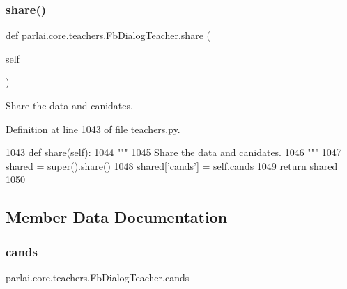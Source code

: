 \mbox{\label{classparlai_1_1core_1_1teachers_1_1FbDialogTeacher_a18a4ea7a7f21eeed7e087cb447a37c5a}} 
\subsubsection{\texorpdfstring{share()}{share()}}
{\footnotesize\ttfamily def parlai.\+core.\+teachers.\+Fb\+Dialog\+Teacher.\+share (\begin{DoxyParamCaption}\item[{}]{self }\end{DoxyParamCaption})}

\begin{DoxyVerb}Share the data and canidates.
\end{DoxyVerb}
 

Definition at line 1043 of file teachers.\+py.


\begin{DoxyCode}
1043     \textcolor{keyword}{def }share(self):
1044         \textcolor{stringliteral}{"""}
1045 \textcolor{stringliteral}{        Share the data and canidates.}
1046 \textcolor{stringliteral}{        """}
1047         shared = super().share()
1048         shared[\textcolor{stringliteral}{'cands'}] = self.cands
1049         \textcolor{keywordflow}{return} shared
1050 
\end{DoxyCode}


\subsection{Member Data Documentation}
\mbox{\label{classparlai_1_1core_1_1teachers_1_1FbDialogTeacher_a3ec67545250d8a877038667e3f4ea158}} 
\subsubsection{\texorpdfstring{cands}{cands}}
{\footnotesize\ttfamily parlai.\+core.\+teachers.\+Fb\+Dialog\+Teacher.\+cands}



